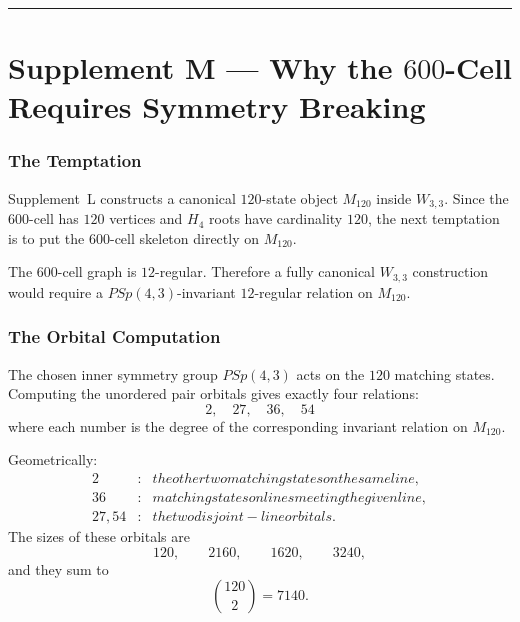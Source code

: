 \documentclass[12pt,a4paper]{article}
\def\mathrm#1{#1}%
\def\mathcal#1{#1}%
\def\text#1{#1}%
\theoremstyle{definition}
\newcommand{\PSp}{\mathrm{PSp}}
\begin{document}
\begin{center}
\rule{0.40\linewidth}{0.4pt}
\end{center}

\clearpage
\part*{Supplement M --- Why the $600$-Cell Requires Symmetry Breaking}

\section*{The Temptation}

Supplement~L constructs a canonical $120$-state object
$\mathcal{M}_{120}$ inside $W_{3,3}$. Since the $600$-cell has $120$
vertices and $H_4$ roots have cardinality $120$, the next temptation is
to put the $600$-cell skeleton directly on $\mathcal{M}_{120}$.

The $600$-cell graph is $12$-regular.  Therefore a fully canonical
$W_{3,3}$ construction would require a $\PSp(4,3)$-invariant
$12$-regular relation on $\mathcal{M}_{120}$.

\section*{The Orbital Computation}

The chosen inner symmetry group $\PSp(4,3)$ acts on the $120$ matching
states.  Computing the unordered pair orbitals gives exactly four
relations:
\[
\boxed{\;2,\quad 27,\quad 36,\quad 54\;}
\]
where each number is the degree of the corresponding invariant relation
on $\mathcal{M}_{120}$.

Geometrically:
\[
\begin{array}{rcl}
2  &:& \text{the other two matching states on the same line},\\
36 &:& \text{matching states on lines meeting the given line},\\
27,54 &:& \text{the two disjoint-line orbitals}.
\end{array}
\]
The sizes of these orbitals are
\[
120,\qquad 2160,\qquad 1620,\qquad 3240,
\]
and they sum to
\[
\binom{120}{2}=7140.
\]
\end{document}

